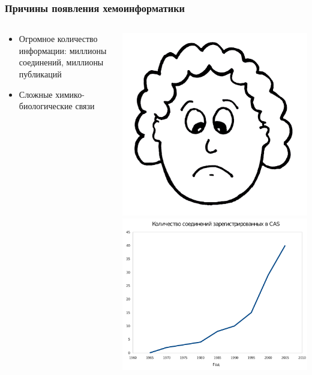 \begin{frame}
  \frametitle{Причины появления хемоинформатики}
  \begin{columns}
    \begin{column}{0.5\textwidth}
  \begin{itemize}
    \item Огромное количество информации: миллионы соединений, миллионы публикаций
    \item Сложные химико-биологические связи
  \end{itemize}
   \end{column}
   \begin{column}{0.5\textwidth}
     \centering \includegraphics[scale=0.2]{images/sad.png} \\ 
     \includegraphics[scale=0.35]{images/graph.pdf}
   \end{column}
 \end{columns}


\end{frame}

